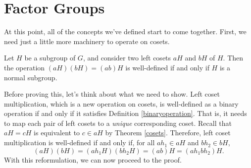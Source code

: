 \section{Factor Groups}

At this point, all of the concepts we've defined start to come together. First, we need just a little more machinery to operate on cosets.


\begin{theorem}
Let $H$ be a subgroup of $G$, and consider two left cosets $aH$ and $bH$ of $H$. Then the operation $(aH)(bH) = (ab)H$ is well-defined if and only if $H$ is a normal subgroup.
\end{theorem}

Before proving this, let's think about what we need to show. Left coset multiplication, which is a new operation on cosets, is well-defined as a binary operation if and only if it satisfies Definition \ref{binaryoperation}. That is, it needs to map each pair of left cosets to a \textit{unique} corresponding coset. Recall that $aH = cH$ is equivalent to $c \in aH$ by Theorem \ref{cosets}. Therefore, left coset multiplication is well-defined if and only if, for all $ah_1 \in aH$ and $bh_2 \in bH$,
\begin{equation*}
    (aH)(bH) = (ah_1H)(bh_2H) = (ab)H = (ah_1bh_2)H.
\end{equation*}
With this reformulation, we can now proceed to the proof.

